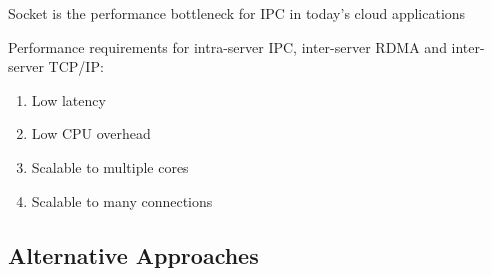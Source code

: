 Socket is the performance bottleneck for IPC in today’s cloud applications 


Performance requirements for intra-server IPC, inter-server RDMA and inter-server TCP/IP:

\begin{enumerate}
\item Low latency 
\item Low CPU overhead 
\item Scalable to multiple cores 
\item Scalable to many connections 
\end{enumerate}

\subsection{Alternative Approaches}
\label{subsec:related}


\begin{table}[t]
	\centering
{}
	\caption{Comparison of alternative socket implementations.}
	\label{tab:related-work}
\end{table}


